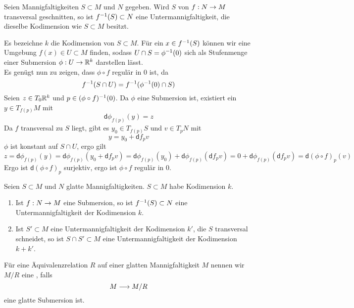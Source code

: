 \documentclass{book}
\renewcommand{\d}{\textsf{d}}
\begin{document}
\Prop{}
Seien Mannigfaltigkeiten $S \subset M$ und $N$ gegeben. Wird $S$ von $f : N \overset{}{\rightarrow} M$ transversal geschnitten, so ist $f^{-1}(S) \subset N$ eine Untermannigfaltigkeit, die dieselbe Kodimension wie $S \subset M$ besitzt. 
\begin{Beweis}{}
Es bezeichne $k$ die Kodimension von $S \subset M$. Für ein $x\in f^{-1}(S)$ können wir eine Umgebung $f(x) \in U \subset M$ finden, sodass $U\cap S = \phi^{-1}(0)$ sich als Stufenmenge einer Submersion $\phi : U \overset{}{\rightarrow} \mathbb{R}^k$ darstellen lässt.\\
Es genügt nun zu zeigen, dass $\phi \circ f$ regulär in $0$ ist, da
\[ f^{-1}(S \cap U) = f^{-1}(\phi^{-1} (0) \cap S) \]
Seien $z\in T_0\mathbb{R}^k$ und $p\in (\phi \circ f)^{-1}(0)$. Da $\phi$ eine Submersion ist, existiert ein $y \in T_{f(p)}M $ mit
\[ \d\phi_{f(p)}(y) = z \]
Da $f$ transversal zu $S$ liegt, gibt es $y_0 \in T_{f(p)}S$ und $v \in T_pN$ mit
\[ y = y_0  + \d f_p v\]
$\phi$ ist konstant auf $S\cap U$, ergo gilt
\[ z = \d\phi_{f(p)}(y) =\d\phi_{f(p)}( y_0  + \d f_p v) = \d\phi_{f(p)}( y_0 ) +\d\phi_{f(p)}(  \d f_p v) = 0 +\d\phi_{f(p)}(  \d f_p v)
= \d(\phi\circ f)_{p}(v)  \]
Ergo ist $\d(\phi\circ f)_{p}$ surjektiv, ergo ist $\phi \circ f$ regulär in $0$.
\end{Beweis}

\Kor{}
Seien $S\subset M$ und $N$ glatte Mannigfaltigkeiten. $S \subset M$ habe Kodimension $k$.
\begin{enumerate}[1.)]
\item Ist $f : N \overset{}{\rightarrow} M$ eine Submersion, so ist $f^{-1}(S) \subset N$ eine Untermannigfaltigkeit der Kodimension $k$.
\item Ist $S' \subset M$ eine Untermannigfaltigkeit der Kodimension $k'$, die $S$ transversal schneidet, so ist $S \cap S' \subset M$ eine Untermannigfaltigkeit der Kodimension $k + k'$.
\end{enumerate}

\Def{}
Für eine Äquivalenzrelation $R$ auf einer glatten Mannigfaltigkeit $M$ nennen wir $M/R$ eine , falls
\[  M \overset{}{\longrightarrow} M/R \]
eine glatte Submersion ist.
\end{document}
